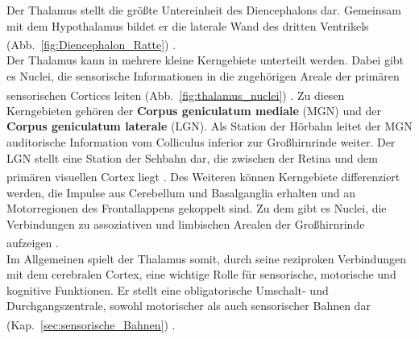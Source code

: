 \documentclass[12pt,a4paper,pdftex]{article}
\begin{document}
Der Thalamus stellt die größte Untereinheit des Diencephalons dar. Gemeinsam mit dem Hypothalamus bildet er die laterale Wand des dritten Ventrikels (Abb.~\ref{fig:Diencephalon_Ratte})  \textsuperscript{\cite[12]{crossman2014neuroanatomy}}. \\

\noindent Der Thalamus kann in mehrere kleine Kerngebiete unterteilt werden. Dabei gibt es Nuclei, die sensorische Informationen in die zugehörigen Areale der primären sensorischen Cortices leiten (Abb.~\ref{fig:thalamus_nuclei}) \textsuperscript{\cite[12]{crossman2014neuroanatomy}}. Zu diesen Kerngebieten gehören der \textbf{Corpus geniculatum mediale} (MGN) und der \textbf{Corpus geniculatum laterale} (LGN). Als Station der Hörbahn leitet der MGN auditorische Information vom Colliculus inferior zur Großhirnrinde weiter. Der LGN stellt eine Station der Sehbahn dar, die zwischen der Retina und dem primären visuellen Cortex liegt \textsuperscript{\cite[14]{penzlin2005tierphys}}. Des Weiteren können Kerngebiete differenziert werden, die Impulse aus Cerebellum und Basalganglia erhalten und an Motorregionen des Frontallappens gekoppelt sind. Zu dem gibt es Nuclei, die Verbindungen zu assoziativen und limbischen Arealen der Großhirnrinde aufzeigen \textsuperscript{\cite[12]{crossman2014neuroanatomy}}.\\
\noindent Im Allgemeinen spielt der Thalamus somit, durch seine reziproken Verbindungen mit dem cerebralen Cortex, eine wichtige Rolle für sensorische, motorische und kognitive Funktionen. Er stellt eine obligatorische Umschalt- und Durchgangszentrale, sowohl motorischer als auch sensorischer Bahnen dar (Kap.~\ref{sec:sensorische_Bahnen}) \textsuperscript{\cite[6]{storch2012lehrbuchzoo}}.
\end{document}
